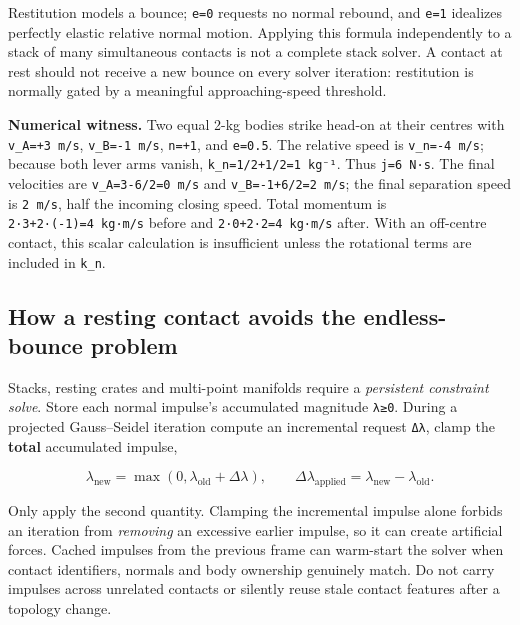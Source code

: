 Restitution models a bounce; \texttt{e=0} requests no normal rebound, and \texttt{e=1} idealizes perfectly elastic relative normal motion. Applying this formula independently to a stack of many simultaneous contacts is not a complete stack solver. A contact at rest should not receive a new bounce on every solver iteration: restitution is normally gated by a meaningful approaching-speed threshold.

\textbf{Numerical witness.} Two equal 2-kg bodies strike head-on at their centres with \texttt{v\_A=+3\ m/s}, \texttt{v\_B=-1\ m/s}, \texttt{n=+1}, and \texttt{e=0.5}. The relative speed is \texttt{v\_n=-4\ m/s}; because both lever arms vanish, \texttt{k\_n=1/2+1/2=1\ kg⁻¹}. Thus \texttt{j=6\ N·s}. The final velocities are \texttt{v\textquotesingle{}\_A=3-6/2=0\ m/s} and \texttt{v\textquotesingle{}\_B=-1+6/2=2\ m/s}; the final separation speed is \texttt{2\ m/s}, half the incoming closing speed. Total momentum is \texttt{2·3+2·(-1)=4\ kg·m/s} before and \texttt{2·0+2·2=4\ kg·m/s} after. With an off-centre contact, this scalar calculation is insufficient unless the rotational terms are included in \texttt{k\_n}.

\subsection{How a resting contact avoids the endless-bounce problem}\label{06-engine-ii-ch033-how-a-resting-contact-avoids-the-endless-bounce-problem}

\hypertarget{06-engine-ii-ch033-how-a-resting-contact-avoids-the-endless-bounce-problem}{}

Stacks, resting crates and multi-point manifolds require a \emph{persistent constraint solve}. Store each normal impulse's accumulated magnitude \texttt{λ≥0}. During a projected Gauss--Seidel iteration compute an incremental request \texttt{Δλ}, clamp the \textbf{total} accumulated impulse,

\[
\lambda_{\mathrm{new}}=\max(0,\lambda_{\mathrm{old}}+\Delta\lambda),\qquad
\Delta\lambda_{\mathrm{applied}}=\lambda_{\mathrm{new}}-\lambda_{\mathrm{old}}.
\]

Only apply the second quantity. Clamping the incremental impulse alone forbids an iteration from \emph{removing} an excessive earlier impulse, so it can create artificial forces. Cached impulses from the previous frame can warm-start the solver when contact identifiers, normals and body ownership genuinely match. Do not carry impulses across unrelated contacts or silently reuse stale contact features after a topology change.

